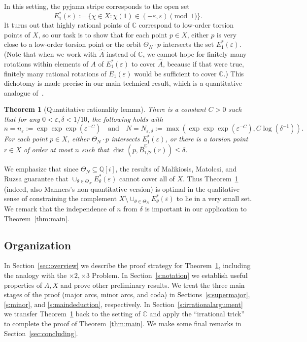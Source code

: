 \documentclass[11pt]{amsart}
\newtheorem{theorem}[lemma]{Theorem}
\theoremstyle{definition}
\DeclareMathOperator{\dist}{dist}
\begin{document}
In this setting, the pyjama stripe corresponds to the open set
$$E^*_1(\varepsilon):=\{\chi \in X: \chi(1) \in (-\varepsilon,\varepsilon) \pmod{1}\}.$$
It turns out that highly rational points of $\mathbb{C}$ correspond to low-order torsion points of $X$, so our task is to show that for each point $p \in X$, either $p$ is very close to a low-order torsion point or the orbit $\Theta_N \cdot p$ intersects the set $E^*_1(\varepsilon)$.  (Note that when we work with $\widehat{A}$ instead of $\widehat{\mathbb{C}}$, we cannot hope for finitely many rotations within elements of $A$ of $E^*_1(\varepsilon)$ to cover $\widehat{A}$, because if that were true, finitely many rational rotations of $E_1(\varepsilon)$ would be sufficient to cover $\mathbb{C}$.) This dichotomy is made precise in our main technical result, which is a quantitative analogue of~\cite[Lemma 5.2]{Man13}.

\begin{theorem}[Quantitative rationality lemma]\label{thm:quantitative-rationality}
There is a constant $C>0$ such that for any $0<\varepsilon, \delta<1/10$, the following holds with $$n=n_\varepsilon:=\exp\exp\exp(\varepsilon^{-C}) \quad \text{and} \quad N=N_{\varepsilon, \delta}:=\max(\exp\exp\exp(\varepsilon^{-C}), C\log(\delta^{-1})).$$ 
For each point $p \in X$, either $\Theta_N \cdot p$ intersects $E_1^*(\varepsilon)$, or there is a torsion point $r \in X$ of order at most $n$ such that $\dist(p, \overline{B}_{1/2}^{\mathbb{C}}(r)) \leq \delta$.
\end{theorem}

We emphasize that since $\Theta_N \subseteq \mathbb{Q}[i]$, the results of Malikiosis, Matolcsi, and Ruzsa guarantee that $\cup_{\theta \in \Theta_N} E^*_\theta(\varepsilon)$ cannot cover all of $X$.  Thus Theorem~\ref{thm:quantitative-rationality} (indeed, also Manners's non-quantitative version) is optimal in the qualitative sense of constraining the complement $X \setminus \cup_{\theta \in \Theta_N} E^*_\theta(\varepsilon)$ to lie in a very small set.  We remark that the independence of $n$ from $\delta$ is important in our application to Theorem~\ref{thm:main}.

\subsection{Organization}
In Section~\ref{sec:overview} we describe the proof strategy for Theorem~\ref{thm:quantitative-rationality}, including the analogy with the $\times 2, \times 3$ Problem.  In Section~\ref{s:notation} we establish useful properties of $A,X$ and prove other preliminary results.  We treat the three main stages of the proof (major arcs, minor arcs, and coda) in Sections~\ref{s:supermajor}, \ref{s:minor}, and \ref{s:maindeduction}, respectively.  In Section~\ref{s:irrationalargument} we transfer Theorem~\ref{thm:quantitative-rationality} back to the setting of $\mathbb{C}$ and apply the ``irrational trick'' to complete the proof of Theorem~\ref{thm:main}.  We make some final remarks in Section~\ref{sec:concluding}.
\end{document}
